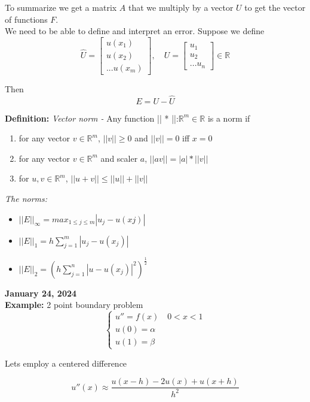 \documentclass[10pt]{article}
\newcommand{\R}{\mathbb{R}}
\begin{document}
To summarize we get a matrix $A$ that we multiply by a vector $U$ to get the vector of functions $F$.\\


We need to be able to define and interpret an error. Suppose we define
$$
\hat{U} =
\begin{bmatrix}
    u(x_1)\\
    u(x_2)\\
    ...
    u(x_m)
\end{bmatrix}
, \quad U = 
\begin{bmatrix}
    u_1\\
    u_2\\
    ...
    u_n
\end{bmatrix}
\in \R
$$

Then
\[E = U - \hat{U}\]

\textbf{Definition:} \textit{Vector norm - } Any function || * ||:$\R^m \in \R$ is a norm if
\begin{enumerate}
    \item for any vector $v \in \R^m$, $||v|| \geq 0$ and $||v|| = 0$ iff $x=0$
    \item for any vector $v \in \R^m$ and scaler $a$, $||av|| = |a| * ||v||$
    \item for $u, v \in \R^m$, $||u + v|| \leq ||u|| + ||v||$
    \end{enumerate}

\textit{The norms:}
\begin{itemize}
    \item $||E||_\infty = max_{1 \leq j \leq m} |u_j - u(xj)|$
    \item $||E||_1 = h \sum^m_{j=1} |u_j - u(x_j) |$
    \item $||E||_2 = (h \sum^n_{j = 1}|u - u(x_j)|^2)^\frac{1}{2}$
    \end{itemize}

\textbf{January 24, 2024}\\

\textbf{Example:} 2 point boundary problem\\

\[\begin{cases}
    u'' = f(x) \quad 0 < x < 1\\
    u(0) = \alpha\\
    u(1) = \beta
  \end{cases}
\]

Lets employ a centered difference

\[u''(x) \approx \frac{u(x-h) - 2u(x) + u(x + h)}{h^2}\]
\end{document}
